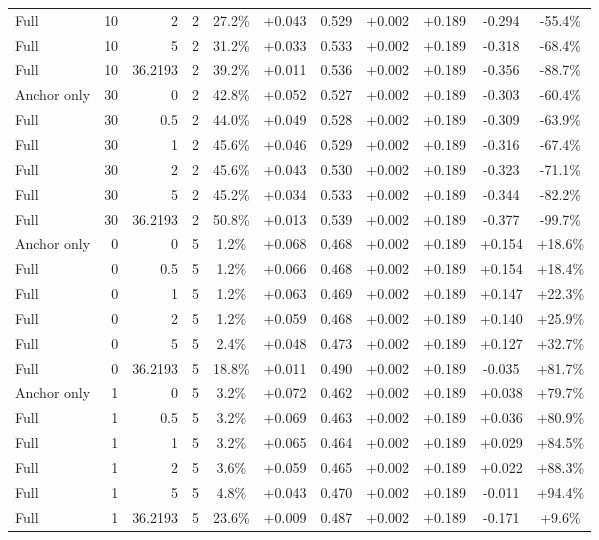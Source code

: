 \begin{table}[htbp]
\begin{tabular}{lrrrccccccc}
Full & 10 & 2 & 2 & 27.2\% & +0.043 & 0.529 & +0.002 & +0.189 & -0.294 & -55.4\% \\
Full & 10 & 5 & 2 & 31.2\% & +0.033 & 0.533 & +0.002 & +0.189 & -0.318 & -68.4\% \\
Full & 10 & 36.2193 & 2 & 39.2\% & +0.011 & 0.536 & +0.002 & +0.189 & -0.356 & -88.7\% \\
Anchor only & 30 & 0 & 2 & 42.8\% & +0.052 & 0.527 & +0.002 & +0.189 & -0.303 & -60.4\% \\
Full & 30 & 0.5 & 2 & 44.0\% & +0.049 & 0.528 & +0.002 & +0.189 & -0.309 & -63.9\% \\
Full & 30 & 1 & 2 & 45.6\% & +0.046 & 0.529 & +0.002 & +0.189 & -0.316 & -67.4\% \\
Full & 30 & 2 & 2 & 45.6\% & +0.043 & 0.530 & +0.002 & +0.189 & -0.323 & -71.1\% \\
Full & 30 & 5 & 2 & 45.2\% & +0.034 & 0.533 & +0.002 & +0.189 & -0.344 & -82.2\% \\
Full & 30 & 36.2193 & 2 & 50.8\% & +0.013 & 0.539 & +0.002 & +0.189 & -0.377 & -99.7\% \\
Anchor only & 0 & 0 & 5 & 1.2\% & +0.068 & 0.468 & +0.002 & +0.189 & +0.154 & +18.6\% \\
Full & 0 & 0.5 & 5 & 1.2\% & +0.066 & 0.468 & +0.002 & +0.189 & +0.154 & +18.4\% \\
Full & 0 & 1 & 5 & 1.2\% & +0.063 & 0.469 & +0.002 & +0.189 & +0.147 & +22.3\% \\
Full & 0 & 2 & 5 & 1.2\% & +0.059 & 0.468 & +0.002 & +0.189 & +0.140 & +25.9\% \\
Full & 0 & 5 & 5 & 2.4\% & +0.048 & 0.473 & +0.002 & +0.189 & +0.127 & +32.7\% \\
Full & 0 & 36.2193 & 5 & 18.8\% & +0.011 & 0.490 & +0.002 & +0.189 & -0.035 & +81.7\% \\
Anchor only & 1 & 0 & 5 & 3.2\% & +0.072 & 0.462 & +0.002 & +0.189 & +0.038 & +79.7\% \\
Full & 1 & 0.5 & 5 & 3.2\% & +0.069 & 0.463 & +0.002 & +0.189 & +0.036 & +80.9\% \\
Full & 1 & 1 & 5 & 3.2\% & +0.065 & 0.464 & +0.002 & +0.189 & +0.029 & +84.5\% \\
Full & 1 & 2 & 5 & 3.6\% & +0.059 & 0.465 & +0.002 & +0.189 & +0.022 & +88.3\% \\
Full & 1 & 5 & 5 & 4.8\% & +0.043 & 0.470 & +0.002 & +0.189 & -0.011 & +94.4\% \\
Full & 1 & 36.2193 & 5 & 23.6\% & +0.009 & 0.487 & +0.002 & +0.189 & -0.171 & +9.6\% \\

\end{tabular}
\end{table}
